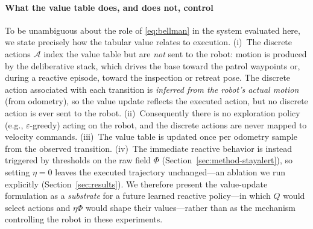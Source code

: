 \paragraph*{What the value table does, and does not, control} To be unambiguous
about the role of \eqref{eq:bellman} in the system evaluated here, we state
precisely how the tabular value relates to execution. (i)~The discrete actions
$\mathcal{A}$ index the value table but are \emph{not} sent to the robot: motion
is produced by the deliberative stack, which drives the base toward the patrol
waypoints or, during a reactive episode, toward the inspection or retreat pose.
The discrete action associated with each transition is \emph{inferred from the
robot's actual motion} (from odometry), so the value update reflects the executed
action, but no discrete action is ever sent to the robot.
(ii)~Consequently there is no exploration policy (e.g., $\varepsilon$-greedy)
acting on the robot, and the discrete actions are never mapped to velocity
commands. (iii)~The value table is updated once per odometry sample from the
observed transition. (iv)~The immediate reactive behavior is instead triggered by
thresholds on the raw field $\Phi$ (Section~\ref{sec:method-stayalert}), so
setting $\eta=0$ leaves the executed trajectory unchanged---an ablation we run
explicitly (Section~\ref{sec:results}). We therefore present the value-update
formulation as a \emph{substrate} for a future learned reactive policy---in which
$Q$ would select actions and $\eta\Phi$ would shape their values---rather than as
the mechanism controlling the robot in these experiments.


